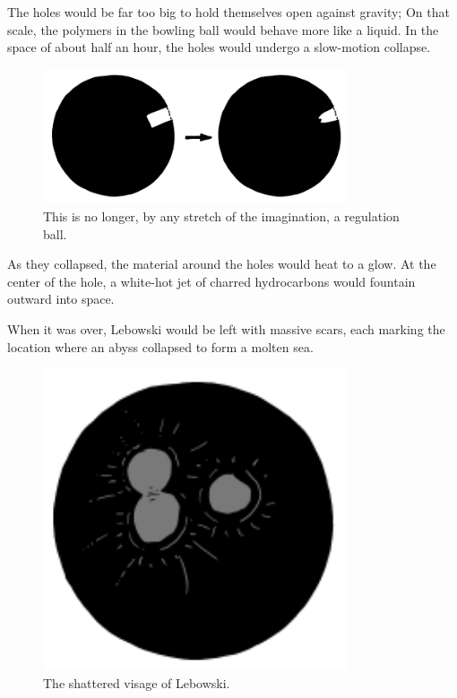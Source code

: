{{The holes would be far too big to hold themselves open against gravity; On that scale, the polymers in the bowling ball would behave more like a liquid. In the space of about half an hour, the holes would undergo a slow-motion collapse.}

\begin{figure}[!htbp]
\centering
\includegraphics[scale=0.5, max width=0.8\textwidth]{imgs/a/46/bowling_holes_collapse.png}
\caption{This is no longer, by any stretch of the imagination, a regulation ball.}
\end{figure}

{As they collapsed, the material around the holes would heat to a glow. At the center of the hole, a white-hot jet of charred hydrocarbons would fountain outward into space.}

{When it was over, Lebowski would be left with massive scars, each marking the location where an abyss collapsed to form a molten sea.}

\begin{figure}[!htbp]
\centering
\includegraphics[scale=0.5, max width=0.8\textwidth]{imgs/a/46/bowling_craters.png}
\caption{The shattered visage of Lebowski.}
\end{figure}

}
